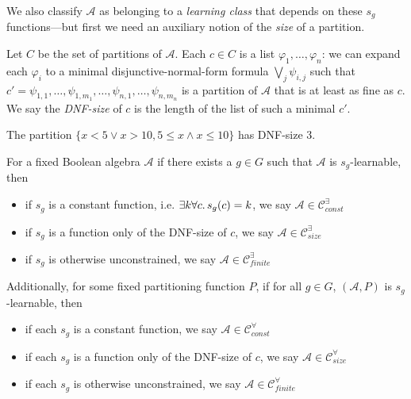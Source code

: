 We also classify $\mathcal{A}$
as belonging to a \emph{learning class}
that depends on these $s_g$ functions---but
first we need an auxiliary notion of the \emph{size}
of a partition.

\begin{definition}
    Let $C$ be the set of partitions of $\mathcal{A}$.
    Each $c \in C$ is a list $\varphi_1, \ldots, \varphi_n$:
    we can expand each $\varphi_i$ to a minimal
    disjunctive-normal-form formula $\bigvee_j \psi_{i,j}$
    such that
    $c' = \psi_{1,1}, \ldots, \psi_{1,m_1}, \ldots, \psi_{n,1}, \ldots, \psi_{n,m_n}$
    is a partition of $\mathcal{A}$ that is
    at least as fine as $c$.
    We say the \emph{DNF-size} of $c$
    is the length of the list of such a minimal $c'$.
\end{definition}

\begin{example}
    The partition $\{x < 5 \lor x > 10, 5 \leq x \land x \leq 10\}$
    has DNF-size 3.
\end{example}

\begin{definition}
    For a fixed Boolean algebra $\mathcal{A}$
    if there exists a $g \in G$ such that
    $\mathcal{A}$ is $s_g$-learnable, then
    \begin{itemize}
        \item if $s_g$ is a constant function,
            i.e. $\exists k \forall c \ldotp s_g(c) = k$,
            we say $\mathcal{A} \in \mathcal{C}_\textit{const}^\exists$
        \item if $s_g$ is a function only of the DNF-size of $c$,
            we say $\mathcal{A} \in \mathcal{C}_\textit{size}^\exists$
        \item if $s_g$ is otherwise unconstrained,
            we say $\mathcal{A} \in \mathcal{C}_\textit{finite}^\exists$
    \end{itemize}

    Additionally, for some fixed partitioning function $P$,
    if for all $g \in G$,
    $(\mathcal{A}, P)$ is $s_g$-learnable, then
    \begin{itemize}
        \item if each $s_g$ is a constant function,
            we say $\mathcal{A} \in \mathcal{C}_\textit{const}^\forall$
        \item if each $s_g$ is a function only of the DNF-size of $c$,
            we say $\mathcal{A} \in \mathcal{C}_\textit{size}^\forall$
        \item if each $s_g$ is otherwise unconstrained,
            we say $\mathcal{A} \in \mathcal{C}_\textit{finite}^\forall$
    \end{itemize}
\end{definition}
%

